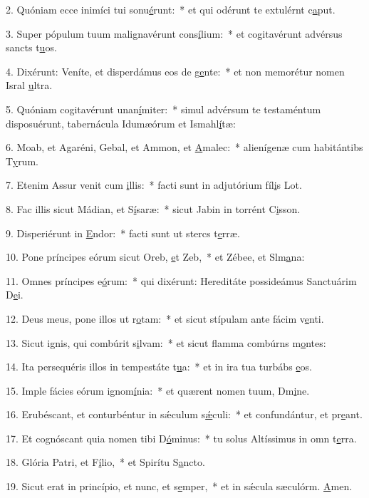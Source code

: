 2. Quóniam ecce inimíci tui sonu\uline{é}runt:~* et qui odérunt te extulérnt c\uline{a}put.\par 
3. Super pópulum tuum malignavérunt cons\uline{í}lium:~* et cogitavérunt advérsus sancts t\uline{u}os.\par 
4. Dixérunt: Veníte, et disperdámus eos de g\uline{e}nte:~* et non memorétur nomen Isral \uline{u}ltra.\par 
5. Quóniam cogitavérunt unan\uline{í}miter:~* simul advérsum te testaméntum disposuérunt, tabernácula Idumæórum et Ismahl\uline{í}tæ:\par 
6. Moab, et Agaréni, Gebal, et Ammon, et \uline{A}malec:~* alienígenæ cum habitántibs T\uline{y}rum.\par 
7. Etenim Assur venit cum \uline{i}llis:~* facti sunt in adjutórium fíl\uline{i}s Lot.\par 
8. Fac illis sicut Mádian, et S\uline{í}saræ:~* sicut Jabin in torrént C\uline{i}sson.\par 
9. Disperiérunt in \uline{E}ndor:~* facti sunt ut stercs t\uline{e}rræ.\par 
10. Pone príncipes eórum sicut Oreb, \uline{e}t Zeb,~* et Zébee, et Slm\uline{a}na:\par 
11. Omnes príncipes e\uline{ó}rum:~* qui dixérunt: Hereditáte possideámus Sanctuárim D\uline{e}i.\par 
12. Deus meus, pone illos ut r\uline{o}tam:~* et sicut stípulam ante fácim v\uline{e}nti.\par 
13. Sicut ignis, qui combúrit s\uline{i}lvam:~* et sicut flamma combúrns m\uline{o}ntes:\par 
14. Ita persequéris illos in tempestáte t\uline{u}a:~* et in ira tua turbábs \uline{e}os.\par 
15. Imple fácies eórum ignom\uline{í}nia:~* et quærent nomen tuum, Dm\uline{i}ne.\par 
16. Erubéscant, et conturbéntur in sǽculum s\uline{ǽ}culi:~* et confundántur, et pr\uline{e}ant.\par 
17. Et cognóscant quia nomen tibi D\uline{ó}minus:~* tu solus Altíssimus in omn t\uline{e}rra.\par 
18. Glória Patri, et F\uline{í}lio,~* et Spirítu S\uline{a}ncto.\par 
19. Sicut erat in princípio, et nunc, et s\uline{e}mper,~* et in sǽcula sæculórm. \uline{A}men.\par 

